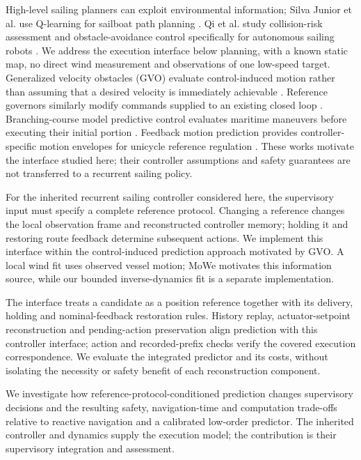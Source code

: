 \documentclass[conference]{IEEEtran}
\begin{document}
High-level sailing planners can exploit environmental information; Silva Junior et al. use Q-learning for sailboat path planning \cite{ref1}. Qi et al. study collision-risk assessment and obstacle-avoidance control specifically for autonomous sailing robots \cite{ref2}. We address the execution interface below planning, with a known static map, no direct wind measurement and observations of one low-speed target. Generalized velocity obstacles (GVO) evaluate control-induced motion rather than assuming that a desired velocity is immediately achievable \cite{ref3}. Reference governors similarly modify commands supplied to an existing closed loop \cite{ref4}. Branching-course model predictive control evaluates maritime maneuvers before executing their initial portion \cite{ref5}. Feedback motion prediction provides controller-specific motion envelopes for unicycle reference regulation \cite{ref6}. These works motivate the interface studied here; their controller assumptions and safety guarantees are not transferred to a recurrent sailing policy.

For the inherited recurrent sailing controller considered here, the supervisory input must specify a complete reference protocol. Changing a reference changes the local observation frame and reconstructed controller memory; holding it and restoring route feedback determine subsequent actions. We implement this interface within the control-induced prediction approach motivated by GVO. A local wind fit uses observed vessel motion; MoWe \cite{ref7} motivates this information source, while our bounded inverse-dynamics fit is a separate implementation.

The interface treats a candidate as a position reference together with its delivery, holding and nominal-feedback restoration rules. History replay, actuator-setpoint reconstruction and pending-action preservation align prediction with this controller interface; action and recorded-prefix checks verify the covered execution correspondence. We evaluate the integrated predictor and its costs, without isolating the necessity or safety benefit of each reconstruction component.

We investigate how reference-protocol-conditioned prediction changes supervisory decisions and the resulting safety, navigation-time and computation trade-offs relative to reactive navigation and a calibrated low-order predictor. The inherited controller and dynamics supply the execution model; the contribution is their supervisory integration and assessment.
\end{document}

